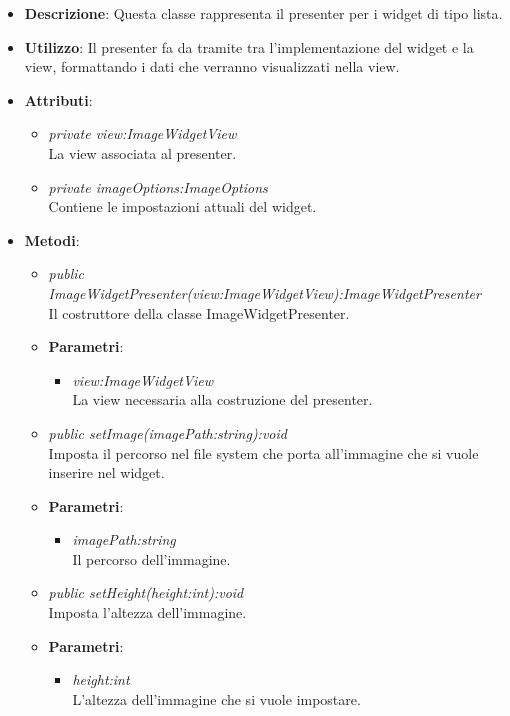 \begin{itemize}
\item \textbf{Descrizione}: Questa classe rappresenta il presenter per i widget di tipo lista.
\item \textbf{Utilizzo}: Il presenter fa da tramite tra l'implementazione del widget e la view, formattando i dati che verranno visualizzati nella view.
\item \textbf{Attributi}:
	\begin{itemize}
	\item \textit{private view:ImageWidgetView}\\
	La view associata al presenter.
	\item \textit{private imageOptions:ImageOptions}\\
	Contiene le impostazioni attuali del widget.
	\end{itemize}
\item \textbf{Metodi}:
	\begin{itemize}
	\item \textit{public ImageWidgetPresenter(view:ImageWidgetView):ImageWidgetPresenter}\\
	Il costruttore della classe ImageWidgetPresenter.
		\item{\textbf{Parametri}: \begin{itemize}
		\item \textit{view:ImageWidgetView}\\
		La view necessaria alla costruzione del presenter.
		\end{itemize}}
	\item \textit{public setImage(imagePath:string):void}\\
	Imposta il percorso nel file system che porta all'immagine che si vuole inserire nel widget.
		\item{\textbf{Parametri}: \begin{itemize}
		\item \textit{imagePath:string}\\
		Il percorso dell'immagine.
		\end{itemize}}
	\item \textit{public setHeight(height:int):void}\\
	Imposta l'altezza dell'immagine.
		\item{\textbf{Parametri}: \begin{itemize}
		\item \textit{height:int}\\
		L'altezza dell'immagine che si vuole impostare.

\end{itemize}}
\end{itemize}
\end{itemize}
